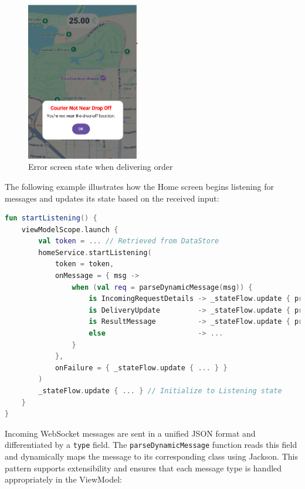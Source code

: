 \begin{figure}[H]
    \centering
    \includegraphics[width=0.44\textwidth]{images/ErrorScreenState.png}
    \caption{Error screen state when delivering order}
    \label{fig:incoming-request-screen}
\end{figure}

\newpage

The following example illustrates how the Home screen begins listening for messages and updates its state based on the received input:

\begin{lstlisting}[language=Kotlin, caption={Simplified WebSocket message handling in startListening}]
fun startListening() {
    viewModelScope.launch {
        val token = ... // Retrieved from DataStore
        homeService.startListening(
            token = token,
            onMessage = { msg ->
                when (val req = parseDynamicMessage(msg)) {
                    is IncomingRequestDetails -> _stateFlow.update { processIncomingRequest(it, req) }
                    is DeliveryUpdate         -> _stateFlow.update { processDeliveryUpdate(it, req) }
                    is ResultMessage          -> _stateFlow.update { processResultMessage(it, req) }
                    else                      -> ...
                }
            },
            onFailure = { _stateFlow.update { ... } }
        )
        _stateFlow.update { ... } // Initialize to Listening state
    }
}
\end{lstlisting}


Incoming WebSocket messages are sent in a unified JSON format and differentiated by a \texttt{type} field. The \texttt{parseDynamicMessage} function reads this field and dynamically maps the message to its corresponding class using Jackson. This pattern supports extensibility and ensures that each message type is handled appropriately in the ViewModel:

